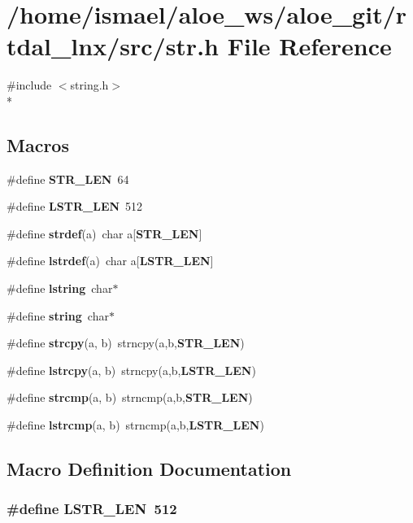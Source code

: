 \section{/home/ismael/aloe\-\_\-ws/aloe\-\_\-git/rtdal\-\_\-lnx/src/str.h File Reference}
\label{str_8h}
{\ttfamily \#include $<$string.\-h$>$}\\*
\subsection*{Macros}
\begin{DoxyCompactItemize}
\item 
\#define {\bf S\-T\-R\-\_\-\-L\-E\-N}~64
\item 
\#define {\bf L\-S\-T\-R\-\_\-\-L\-E\-N}~512
\item 
\#define {\bf strdef}(a)~char a[{\bf S\-T\-R\-\_\-\-L\-E\-N}]
\item 
\#define {\bf lstrdef}(a)~char a[{\bf L\-S\-T\-R\-\_\-\-L\-E\-N}]
\item 
\#define {\bf lstring}~char$\ast$
\item 
\#define {\bf string}~char$\ast$
\item 
\#define {\bf strcpy}(a, b)~strncpy(a,b,{\bf S\-T\-R\-\_\-\-L\-E\-N})
\item 
\#define {\bf lstrcpy}(a, b)~strncpy(a,b,{\bf L\-S\-T\-R\-\_\-\-L\-E\-N})
\item 
\#define {\bf strcmp}(a, b)~strncmp(a,b,{\bf S\-T\-R\-\_\-\-L\-E\-N})
\item 
\#define {\bf lstrcmp}(a, b)~strncmp(a,b,{\bf L\-S\-T\-R\-\_\-\-L\-E\-N})
\end{DoxyCompactItemize}


\subsection{Macro Definition Documentation}
\subsubsection[{L\-S\-T\-R\-\_\-\-L\-E\-N}]{\setlength{\rightskip}{0pt plus 5cm}\#define L\-S\-T\-R\-\_\-\-L\-E\-N~512}\label{str_8h_ab9c0b16e4bb674502096c5b4aa9f6c15}



